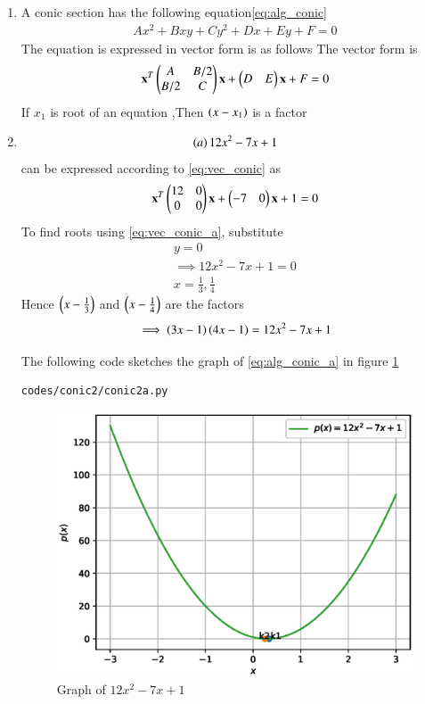 \renewcommand{\theequation}{\theenumi}
\begin{enumerate}[label=\thesection.\arabic*.,ref=\thesection.\theenumi]

\item A conic section has the following equation\ref{eq:alg_conic}
\begin{align}
Ax^2+Bxy+Cy^2+Dx+Ey+F=0
\label{eq:alg_conic}
\end{align}
The equation is expressed in vector form is as follows
The vector form is 
\begin{align}
\label{eq:vec_conic}
\mathbf{x}^T \begin{pmatrix}A & B/2\\B/2 & C\end{pmatrix}\mathbf{x}+ \begin{pmatrix}D & E\end{pmatrix}\mathbf{x}+F=0
\end{align}
If $x_1$ is root of an equation ,Then $\left(x-x_1\right)$ is a factor
\item 
\begin{align}
\label{eq:alg_conic_a}
\left(a\right) 12x^{2} - 7x + 1
\end{align}
can be expressed according to \ref{eq:vec_conic} as 
\begin{align}
\label{eq:vec_conic_a}
\mathbf{x}^T \begin{pmatrix}12 & 0\\0 & 0\end{pmatrix}\mathbf{x}+ \begin{pmatrix}-7 & 0\end{pmatrix}\mathbf{x}+1=0
\end{align}
To find roots using \ref{eq:vec_conic_a}, substitute
\begin{align}
y=0
\\
\implies 
12x^{2}-7x+1=0
\\
x=\frac{1}{3}, \frac{1}{4}
\end{align}
Hence $\left(x-\frac{1}{3}\right)$ and $\left(x-\frac{1}{4}\right)$ are the factors
\begin{align}
\implies \left(3x-1\right)\left(4x-1\right)=12x^{2} - 7x + 1 
\end{align}

The following code sketches the graph of \ref{eq:alg_conic_a} in figure \ref{fig:conic2a}
\begin{lstlisting}
codes/conic2/conic2a.py
\end{lstlisting}
\begin{figure}[!ht]
\centering
\includegraphics[width=\columnwidth]{./codes/conic2/pyfigs/conic2a.eps}
\caption{Graph of $12x^{2} - 7x + 1$}
\label{fig:conic2a}
\end{figure}



\end{enumerate}
